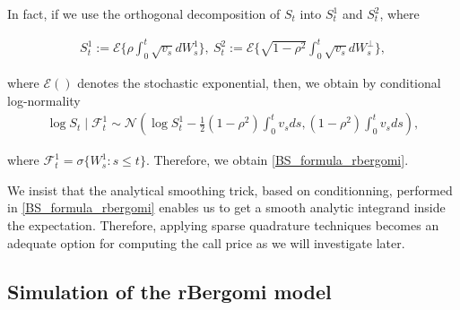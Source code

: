In fact, if we use the orthogonal decomposition of $S_t$ into $S_{t}^1$ and $S_{t}^2$, where

\begin{align*}
	S_t^1:=\mathcal{E}\{ \rho \int_{0}^{t}  \sqrt{v_s} dW_s^1\}, \: S_t^2:= \mathcal{E}\{ \sqrt{1-\rho^2} \int_{0}^{t}  \sqrt{v_s} dW_s^\perp  \}	,
\end{align*}

where $\mathcal{E}()$ denotes the stochastic exponential, then, we obtain by conditional log-normality
\begin{align*}
	\log S_t \mid \mathcal{F}_t^1 \sim \mathcal{N}\left( \log S_t^1-\frac{1}{2} (1-\rho^2) \int_{0}^{t} v_s ds , (1-\rho^2) \int_{0}^{t} v_s ds \right),
\end{align*} 

where $\mathcal{F}_t^1= \sigma\{ W_s^1: s\le t\}$. Therefore, we obtain \eqref{BS_formula_rbergomi}.



We insist that the analytical smoothing trick, based on conditionning, performed in \eqref{BS_formula_rbergomi} enables us to get a smooth analytic integrand inside the expectation. Therefore, applying sparse quadrature techniques becomes an adequate option for computing the call price as we will investigate later.

\subsection{Simulation of the rBergomi model}\label{sec:Simulation of the rBergomi model}

